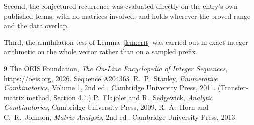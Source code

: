 \documentclass[11pt,a4paper]{article}
\theoremstyle{plain}
\theoremstyle{definition}
\begin{document}
Second, the conjectured recurrence was evaluated directly on the entry's own published terms,
with no matrices involved, and holds wherever the proved range and the data overlap.

Third, the annihilation test of Lemma~\ref{lem:crit} was carried out in exact integer
arithmetic on the whole vector rather than on a sampled prefix.

\begin{thebibliography}{9}
 The OEIS Foundation, \emph{The On-Line Encyclopedia of Integer
Sequences}, \url{https://oeis.org}, 2026. Sequence A204363.
 R.~P.~Stanley, \emph{Enumerative Combinatorics}, Volume 1, 2nd ed.,
Cambridge University Press, 2011. (Transfer-matrix method, Section 4.7.)
 P.~Flajolet and R.~Sedgewick, \emph{Analytic Combinatorics}, Cambridge
University Press, 2009.
 R.~A.~Horn and C.~R.~Johnson, \emph{Matrix Analysis}, 2nd ed., Cambridge
University Press, 2013.
\end{thebibliography}
\end{document}
